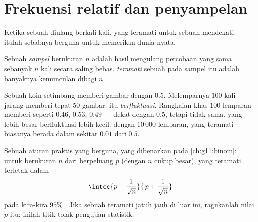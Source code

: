 \section{Frekuensi relatif dan penyampelan}

Ketika sebuah  diulang berkali-kali,  yang
teramati untuk sebuah  mendekati  --- itulah sebabnya
 berguna untuk memerikan dunia nyata.

\begin{definition}[Sampel]\label{def:g10:proba:sample}
Sebuah \emph{sampel} berukuran $n$ adalah hasil mengulang
percobaan yang sama sebanyak $n$ kali secara saling bebas.
\emph{ teramati} sebuah  pada sampel itu adalah
banyaknya kemunculan dibagi $n$.
\end{definition}

\begin{example}\label{ex:g10:proba:sampling}
Sebuah koin setimbang memberi gambar dengan  $0.5$. Melemparnya $100$
kali jarang memberi tepat $50$ gambar:  itu \emph{berfluktuasi}. Rangkaian
khas $100$ lemparan memberi  seperti $0.46$, $0.53$, $0.49$
--- dekat dengan $0.5$, tetapi tidak sama.  yang lebih besar berfluktuasi
lebih kecil: dengan $10\,000$ lemparan,  yang teramati biasanya
berada dalam sekitar $0.01$ dari $0.5$.
\end{example}

\begin{remark}
Sebuah aturan praktis yang berguna, yang dibenarkan pada \cref{ch:g11:binom}:
untuk  berukuran $n$ dari  berpeluang $p$ (dengan $n$ cukup
besar),  yang teramati terletak dalam 
\[
\intcc{p - \frac{1}{\sqrt n}}{\,p + \frac{1}{\sqrt n}}
\]
pada kira-kira $95\%$ . Jika sebuah  teramati jatuh
jauh di luar  ini, ragukanlah nilai $p$ itu: inilah titik tolak
pengujian statistik.
\end{remark}

